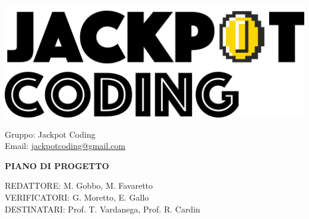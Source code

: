 \documentclass[5pt]{article}
\begin{document}
\begin{minipage}[t]{0.50\textwidth}
    \begin{flushleft}
        \hspace{10pt}
        \includegraphics[scale=0.65]{jackpot-logo.png} 
    \end{flushleft}
\end{minipage}
\hspace{-60pt} %
\begin{flushright}
    \begin{minipage}[t]{0.50\textwidth}
        \begin{flushright}
            Gruppo: {\Large Jackpot Coding}\\
            Email: \href{mailto:jackpotcoding@gmail.com}{jackpotcoding@gmail.com}
        \end{flushright}
    \end{minipage}
\end{flushright}

\vspace{24pt}

\begin{center}
    \textbf{\LARGE PIANO DI PROGETTO}
\end{center}

\vspace{13pt}

\begin{flushleft}
    \begin{spacing}{1.5}
        REDATTORE: M. Gobbo, M. Favaretto\\%
        VERIFICATORI: G. Moretto, E. Gallo\\
        \vspace{7pt}
        DESTINATARI: Prof. T. Vardanega, Prof. R. Cardin\\%
    \end{spacing}
\end{flushleft}
\end{document}
